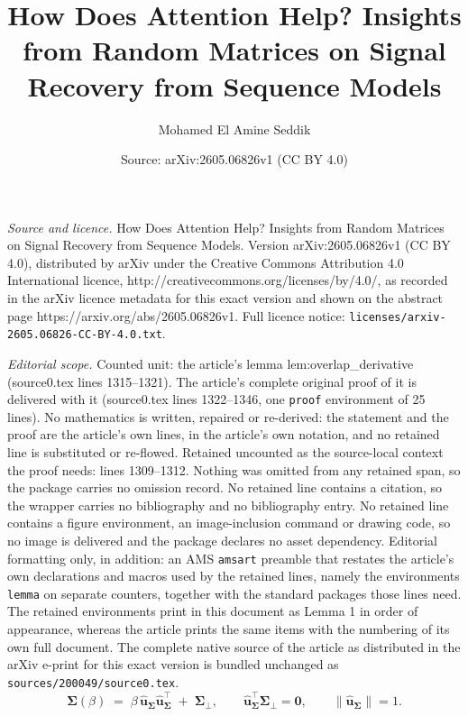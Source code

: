 \documentclass[10pt,a4paper]{amsart}
\title{How Does Attention Help? Insights from Random Matrices on Signal Recovery from Sequence Models}
\author{Mohamed El Amine Seddik}
\date{Source: arXiv:2605.06826v1 (CC BY 4.0)}
\def\mSigma{{\bm{\Sigma}}}
\def\vu{{\bm{u}}}
\def\vzero{{\bm{0}}}
\begin{document}
\maketitle

\noindent\emph{Source and licence.} How Does Attention Help? Insights from Random Matrices on Signal Recovery from Sequence Models. Version arXiv:2605.06826v1 (CC BY 4.0), distributed by arXiv under the Creative Commons Attribution 4.0 International licence, http://creativecommons.org/licenses/by/4.0/, as recorded in the arXiv licence metadata for this exact version and shown on the abstract page https://arxiv.org/abs/2605.06826v1. Full licence notice: \texttt{licenses/arxiv-2605.06826-CC-BY-4.0.txt}.\par\smallskip

\noindent\textit{Editorial scope.} Counted unit: the article's lemma lem:overlap\_derivative (source0.tex lines 1315--1321). The article's complete original proof of it is delivered with it (source0.tex lines 1322--1346, one \texttt{proof} environment of 25 lines). No mathematics is written, repaired or re-derived: the statement and the proof are the article's own lines, in the article's own notation, and no retained line is substituted or re-flowed.  Retained uncounted as the source-local context the proof needs: lines 1309--1312.  Nothing was omitted from any retained span, so the package carries no omission record.  No retained line contains a citation, so the wrapper carries no bibliography and no bibliography entry.  No retained line contains a figure environment, an image-inclusion command or drawing code, so no image is delivered and the package declares no asset dependency.  Editorial formatting only, in addition: an AMS \texttt{amsart} preamble that restates the article's own declarations and macros used by the retained lines, namely the environments \texttt{lemma} on separate counters, together with the standard packages those lines need.  The retained environments print in this document as Lemma 1 in order of appearance, whereas the article prints the same items with the numbering of its own full document.  The complete native source of the article as distributed in the arXiv e-print for this exact version is bundled unchanged as \texttt{sources/200049/source0.tex}.
\begin{equation}\label{eq:Sigma_beta_decomp}
    \mSigma(\beta) \;=\; \beta\,\hat\vu_\mSigma\hat\vu_\mSigma^\top \;+\; \mSigma_\perp,
    \qquad \hat\vu_\mSigma^\top\mSigma_\perp=\vzero, \qquad \|\hat\vu_\mSigma\|=1.
\end{equation}
\end{document}
